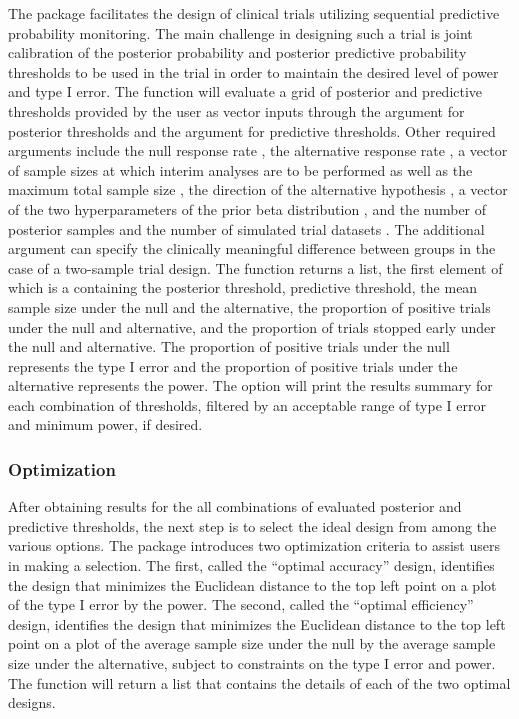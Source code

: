 The  package facilitates the design of clinical trials
utilizing sequential predictive probability monitoring. The main
challenge in designing such a trial is joint calibration of the
posterior probability and posterior predictive probability thresholds to
be used in the trial in order to maintain the desired level of power and
type I error. The  function will evaluate
a grid of posterior and predictive thresholds provided by the user as
vector inputs through the argument  for posterior
thresholds and the argument  for predictive
thresholds. Other required arguments include the null response rate
, the alternative response rate , a vector of
sample sizes at which interim analyses are to be performed  as
well as the maximum total sample size , the direction of the
alternative hypothesis , a vector of the two
hyperparameters of the prior beta distribution , and the
number of posterior samples  and the number of simulated trial
datasets . The additional argument  can specify
the clinically meaningful difference between groups in the case of a
two-sample trial design. The function returns a list, the first element
of which is a  containing the posterior threshold,
predictive threshold, the mean sample size under the null and the
alternative, the proportion of positive trials under the null and
alternative, and the proportion of trials stopped early under the null
and alternative. The proportion of positive trials under the null
represents the type I error and the proportion of positive trials under
the alternative represents the power. The  option will
print the results summary for each combination of thresholds, filtered
by an acceptable range of type I error and minimum power, if desired.

\hypertarget{optimization}{%
\subsubsection{Optimization}\label{optimization}}

After obtaining results for the all combinations of evaluated posterior
and predictive thresholds, the next step is to select the ideal design
from among the various options. The  package introduces two
optimization criteria to assist users in making a selection. The first,
called the ``optimal accuracy'' design, identifies the design that
minimizes the Euclidean distance to the top left point on a plot of the
type I error by the power. The second, called the ``optimal efficiency''
design, identifies the design that minimizes the Euclidean distance to
the top left point on a plot of the average sample size under the null
by the average sample size under the alternative, subject to constraints
on the type I error and power. The  function
will return a list that contains the details of each of the two optimal
designs.

